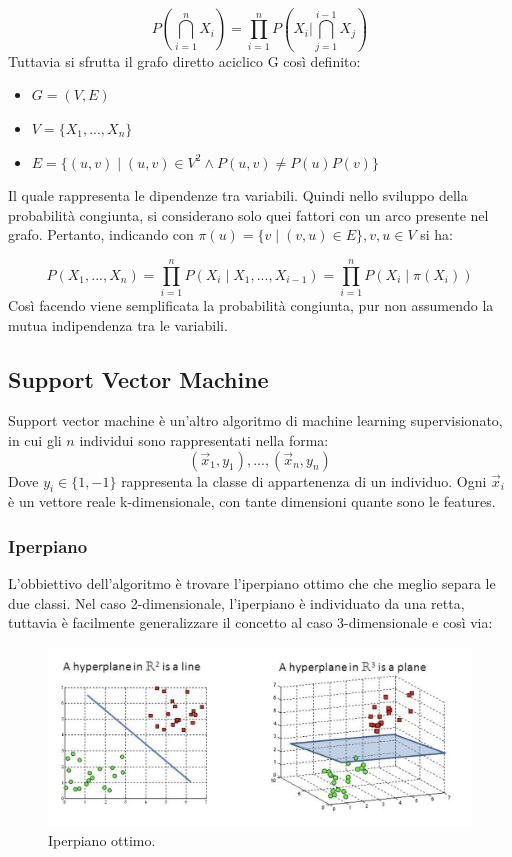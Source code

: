 \documentclass[oneside]{book}
\begin{document}
\[ 
P \left( \bigcap_{i=1}^n X_i \right) = 
\prod\limits_{i=1}^{n}P
\left( X_i  \bigg\vert
\bigcap_{j=1}^{i-1} X_j \right)
\]
Tuttavia si sfrutta il grafo diretto aciclico G così definito:
\begin{itemize}
	\item $G = (V, E)$
	\item $V = \{X_1, ..., X_n\}$
	\item $E = \{(u,v) \mid (u,v) \in V^2 \land P(u, v) \neq P(u)P(v) \}$
\end{itemize}
Il quale rappresenta le dipendenze tra variabili. Quindi nello sviluppo della probabilità congiunta, si considerano solo quei fattori con un arco presente nel grafo. Pertanto, indicando con $\pi(u) = \{v \mid (v, u) \in E\}, v,u \in V$ si ha:


$$P(X_1, ..., X_n) = \prod\limits_{i=1}^{n}P(X_i \mid X_1, ..., X_{i-1}) = \prod\limits_{i=1}^{n}P(X_i \mid \pi(X_i)) $$
Così facendo viene semplificata la probabilità congiunta, pur non assumendo la mutua indipendenza tra le variabili.

\newpage
\subsection{Support Vector Machine}
Support vector machine è un'altro algoritmo di machine learning supervisionato, in cui gli $n$ individui sono rappresentati nella forma:
$$(\vec{x}_1, y_1),...,(\vec{x}_n, y_n)$$
Dove $y_i \in \{1, -1\}$ rappresenta la classe di appartenenza di un individuo. Ogni $\vec{x}_i$ è un vettore reale k-dimensionale, con tante dimensioni quante sono le features.

\subsubsection{Iperpiano}
L'obbiettivo dell'algoritmo è trovare l'iperpiano ottimo che che meglio separa le due classi.
Nel caso 2-dimensionale, l'iperpiano è individuato da una retta, tuttavia è facilmente generalizzare il concetto al caso 3-dimensionale e così via:
\begin{figure}[h!]
	\centering
	\includegraphics[width=15cm]{assets/svm-hyperplane.png}
	\caption[Caption for LOF]{Iperpiano ottimo.\footnotemark}
	\label{fig:svm-2d}
\end{figure}
\end{document}
